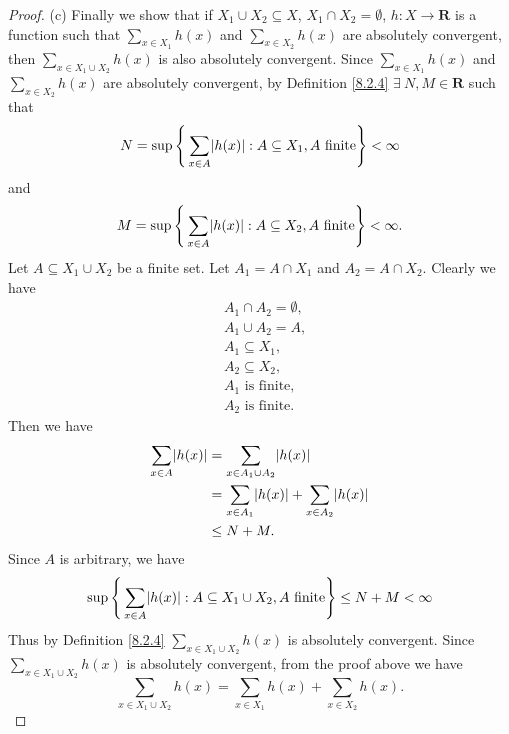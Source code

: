 \begin{proof}{(c)}
    Finally we show that if \(X_1 \cup X_2 \subseteq X\), \(X_1 \cap X_2 = \emptyset\), \(h : X \to \mathbf{R}\) is a function such that \(\sum_{x \in X_1} h(x)\) and \(\sum_{x \in X_2} h(x)\) are absolutely convergent, then \(\sum_{x \in X_1 \cup X_2} h(x)\) is also absolutely convergent.
    Since \(\sum_{x \in X_1} h(x)\) and \(\sum_{x \in X_2} h(x)\) are absolutely convergent, by Definition \ref{8.2.4} \(\exists\ N, M \in \mathbf{R}\) such that
    \[
        N = \sup\Bigg\{\sum_{x \in A} \abs*{h(x)} : A \subseteq X_1, A \text{ finite}\Bigg\} < \infty
    \]
    and
    \[
        M = \sup\Bigg\{\sum_{x \in A} \abs*{h(x)} : A \subseteq X_2, A \text{ finite}\Bigg\} < \infty.
    \]
    Let \(A \subseteq X_1 \cup X_2\) be a finite set.
    Let \(A_1 = A \cap X_1\) and \(A_2 = A \cap X_2\).
    Clearly we have
    \begin{align*}
         & A_1 \cap A_2 = \emptyset, \\
         & A_1 \cup A_2 = A,         \\
         & A_1 \subseteq X_1,        \\
         & A_2 \subseteq X_2,        \\
         & A_1 \text{ is finite},    \\
         & A_2 \text{ is finite}.
    \end{align*}
    Then we have
    \begin{align*}
        \sum_{x \in A} \abs*{h(x)} & = \sum_{x \in A_1 \cup A_2} \abs*{h(x)}                       \\
                                   & = \sum_{x \in A_1} \abs*{h(x)} + \sum_{x \in A_2} \abs*{h(x)} \\
                                   & \leq N + M.
    \end{align*}
    Since \(A\) is arbitrary, we have
    \[
        \sup\Bigg\{\sum_{x \in A} \abs*{h(x)} : A \subseteq X_1 \cup X_2, A \text{ finite}\Bigg\} \leq N + M < \infty
    \]
    Thus by Definition \ref{8.2.4} \(\sum_{x \in X_1 \cup X_2} h(x)\) is absolutely convergent.
    Since \(\sum_{x \in X_1 \cup X_2} h(x)\) is absolutely convergent, from the proof above we have
    \[
        \sum_{x \in X_1 \cup X_2} h(x) = \sum_{x \in X_1} h(x) + \sum_{x \in X_2} h(x).
    \]
\end{proof}

